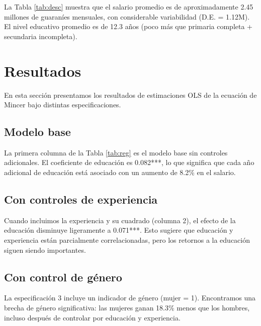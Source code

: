\documentclass[12pt, a4paper]{article}
\begin{document}
La Tabla \ref{tab:desc} muestra que el salario promedio es de aproximadamente 
2.45 millones de guaraníes mensuales, con considerable variabilidad (D.E. = 
1.12M). El nivel educativo promedio es de 12.3 años (poco más que primaria 
completa + secundaria incompleta).

\section{Resultados}

En esta sección presentamos los resultados de estimaciones OLS de la ecuación 
de Mincer bajo distintas especificaciones.

\subsection{Modelo base}

La primera columna de la Tabla \ref{tab:reg} es el modelo base sin controles 
adicionales. El coeficiente de educación es 0.082***, lo que significa que 
cada año adicional de educación está asociado con un aumento de 8.2\% en el 
salario.

\subsection{Con controles de experiencia}

Cuando incluimos la experiencia y su cuadrado (columna 2), el efecto de la 
educación disminuye ligeramente a 0.071***. Esto sugiere que educación y 
experiencia están parcialmente correlacionadas, pero los retornos a la 
educación siguen siendo importantes.

\subsection{Con control de género}

La especificación 3 incluye un indicador de género (mujer = 1). Encontramos 
una brecha de género significativa: las mujeres ganan 18.3\% menos que los 
hombres, incluso después de controlar por educación y experiencia.
\end{document}
